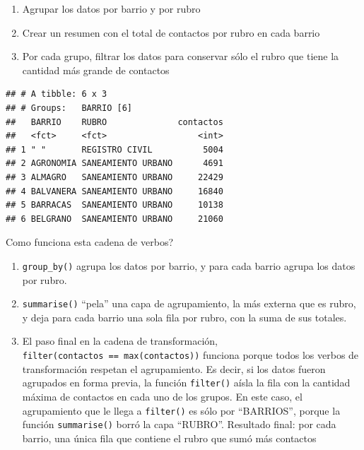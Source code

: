 \documentclass[]{book}
\newenvironment{Shaded}{\begin{snugshade}}{\end{snugshade}}
\newcommand{\KeywordTok}[1]{\textcolor[rgb]{0.13,0.29,0.53}{\textbf{#1}}}
\newcommand{\DataTypeTok}[1]{\textcolor[rgb]{0.13,0.29,0.53}{#1}}
\newcommand{\StringTok}[1]{\textcolor[rgb]{0.31,0.60,0.02}{#1}}
\newcommand{\OperatorTok}[1]{\textcolor[rgb]{0.81,0.36,0.00}{\textbf{#1}}}
\newcommand{\NormalTok}[1]{#1}
\providecommand{\tightlist}{%
  \setlength{\itemsep}{0pt}\setlength{\parskip}{0pt}}
\begin{document}
\begin{enumerate}
\def\labelenumi{\arabic{enumi}.}
\tightlist
\item
  Agrupar los datos por barrio y por rubro
\item
  Crear un resumen con el total de contactos por rubro en cada barrio
\item
  Por cada grupo, filtrar los datos para conservar sólo el rubro que
  tiene la cantidad más grande de contactos
\end{enumerate}

\begin{Shaded}
\end{Shaded}

\begin{verbatim}
## # A tibble: 6 x 3
## # Groups:   BARRIO [6]
##   BARRIO    RUBRO              contactos
##   <fct>     <fct>                  <int>
## 1 " "       REGISTRO CIVIL          5004
## 2 AGRONOMIA SANEAMIENTO URBANO      4691
## 3 ALMAGRO   SANEAMIENTO URBANO     22429
## 4 BALVANERA SANEAMIENTO URBANO     16840
## 5 BARRACAS  SANEAMIENTO URBANO     10138
## 6 BELGRANO  SANEAMIENTO URBANO     21060
\end{verbatim}

Como funciona esta cadena de verbos?

\begin{enumerate}
\def\labelenumi{\arabic{enumi}.}
\item
  \texttt{group\_by()} agrupa los datos por barrio, y para cada barrio
  agrupa los datos por rubro.
\item
  \texttt{summarise()} ``pela'' una capa de agrupamiento, la más externa
  que es rubro, y deja para cada barrio una sola fila por rubro, con la
  suma de sus totales.
\item
  El paso final en la cadena de transformación,
  \texttt{filter(contactos\ ==\ max(contactos))} funciona porque todos
  los verbos de transformación respetan el agrupamiento. Es decir, si
  los datos fueron agrupados en forma previa, la función
  \texttt{filter()} aísla la fila con la cantidad máxima de contactos en
  cada uno de los grupos. En este caso, el agrupamiento que le llega a
  \texttt{filter()} es sólo por ``BARRIOS'', porque la función
  \texttt{summarise()} borró la capa ``RUBRO''. Resultado final: por
  cada barrio, una única fila que contiene el rubro que sumó más
  contactos
\end{enumerate}
\end{document}
